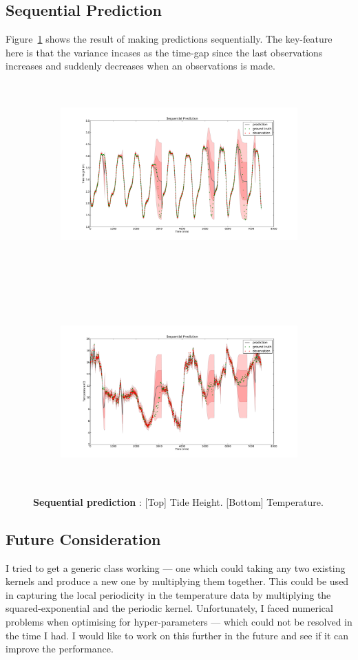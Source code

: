 \documentclass[11pt]{report}
\begin{document}
\subsection*{Sequential Prediction}
Figure~\ref{f3} shows the result of making predictions sequentially. The key-feature here is that the variance incases as the time-gap since the last observations increases and suddenly decreases when an observations is made.
\begin{figure}[h]
\begin{subfigure}[h]{\linewidth}
\includegraphics[width=15cm, height=7cm]{figs/h_seq.pdf}
\end{subfigure}\\
\begin{subfigure}[h]{\linewidth}
\includegraphics[width=15cm, height=7cm]{figs/T_seq.pdf}
\end{subfigure}%
\caption{\textbf{Sequential prediction} : [Top] Tide Height. [Bottom] Temperature.}
\label{f3}
\end{figure}
\clearpage
\subsection*{Future Consideration}
I tried to get a generic class working --- one which could taking any two existing kernels and produce a new one by multiplying them together. This could be used in capturing the local periodicity in the temperature data by multiplying the squared-exponential and the periodic kernel. Unfortunately, I faced numerical problems when optimising for hyper-parameters --- which could not be resolved in the time I had. I would like to work on this further in the future and see if it can improve the performance.
\end{document}
